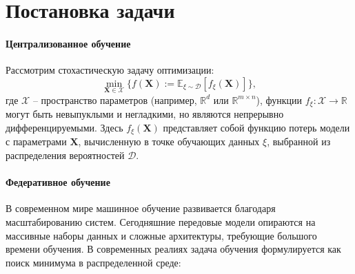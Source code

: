 \documentclass{article}
\begin{document}
\section{Постановка задачи}\label{sec:proState}


\paragraph{Централизованное обучение} Рассмотрим стохастическую задачу оптимизации:
\begin{equation}
\min_{\mathbf{X} \in \mathcal{X}} \{f(\mathbf{X}) := \mathbb{E}_{\xi \sim \mathcal{D}} [f_{\xi}(\mathbf{X})]\},
\end{equation}
где $\mathcal{X}$ -- пространство параметров (например, $\mathbb{R}^d$ или $\mathbb{R}^{m \times n}$),  функции $f_{\xi} : \mathcal{X} \to \mathbb{R}$ могут быть невыпуклыми и негладкими, но являются непрерывно дифференцируемыми. Здесь $f_{\xi}(\mathbf{X})$ представляет собой функцию потерь модели с параметрами $\mathbf{X}$, вычисленную в точке обучающих данных $\xi$, выбранной из распределения вероятностей $\mathcal{D}$.

\paragraph{Федеративное обучение} В современном мире машинное обучение развивается благодаря масштабированию систем. Сегодняшние передовые модели опираются на массивные наборы данных и сложные архитектуры, требующие большого времени обучения. В современных реалиях задача обучения формулируется как поиск минимума в распределенной среде:
\end{document}
